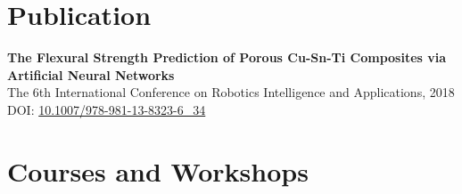 \documentclass[11pt,a4paper]{article}
\begin{document}
\section*{Publication}

\textbf{\color{PrimaryColor}The Flexural Strength Prediction of Porous Cu-Sn-Ti Composites via Artificial Neural Networks}\\
The 6th International Conference on Robotics Intelligence and Applications, 2018\\
DOI:
\href{https://doi.org/10.1007/978-981-13-8323-6_34}
{10.1007/978-981-13-8323-6\_34}

\section*{Courses and Workshops}
\end{document}
